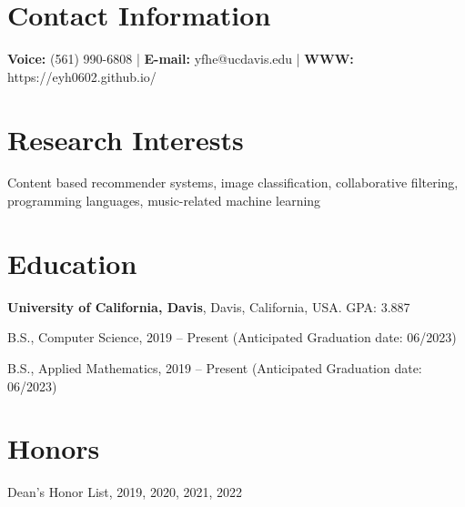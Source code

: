\documentclass[margin,line]{res}
\newenvironment{list1}{
  \begin{list}{\ding{113}}{%
      \setlength{\itemsep}{0in}
      \setlength{\parsep}{0in} \setlength{\parskip}{0in}
      \setlength{\topsep}{0in} \setlength{\partopsep}{0in} 
      \setlength{\leftmargin}{0.17in}}}{\end{list}}
\begin{document}
\vspace*{-1in}

\begin{resume}
\section{\sc Contact Information}
\vspace{.05in}
\textbf{Voice:} (561) 990-6808 |
\textbf{E-mail:} yfhe@ucdavis.edu |
\textbf{WWW:} https://eyh0602.github.io/


\section{\sc Research Interests}
Content based recommender systems, image classification,
collaborative filtering, programming languages,
music-related machine learning
\vspace*{-.1in}

\section{\sc Education}
{\bf University of California, Davis}, Davis, California, USA. GPA: 3.887\\
\vspace*{-.1in}
\begin{list1}
\item[] B.S., Computer Science, 2019 -- Present (Anticipated Graduation date: 06/2023)
\item[] B.S., Applied Mathematics, 2019 -- Present (Anticipated Graduation date: 06/2023)
\end{list1}
\vspace*{-.1in}


\section{\sc Honors} 
Dean's Honor List, 2019, 2020, 2021, 2022
\vspace*{-.1in}


\end{resume}
\end{document}
